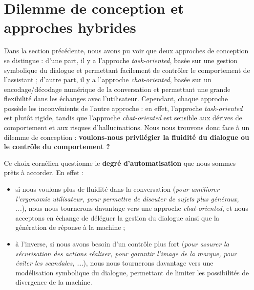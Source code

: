 	
	\newpage
	\section{Dilemme de conception et approches hybrides}
	\label{annex:B.3-ANNEXE-CHATBOTS-DILEMME}
		
		Dans la section précédente, nous avons pu voir que deux approches de conception se distingue :
		d'une part, il y a l'approche \textit{task-oriented}, basée sur une gestion symbolique du dialogue et permettant facilement de contrôler le comportement de l'assistant ;
		d'autre part, il y a l'approche \textit{chat-oriented}, basée sur un encodage/décodage numérique de la conversation et permettant une grande flexibilité dans les échanges avec l'utilisateur.
		Cependant, chaque approche possède les inconvénients de l'autre approche :
		en effet, l'approche \textit{task-oriented} est plutôt rigide, tandis que l'approche \textit{chat-oriented} est sensible aux dérives de comportement et aux risques d'hallucinations.
		Nous nous trouvons donc face à un dilemme de conception : \textbf{voulons-nous privilégier la fluidité du dialogue ou le contrôle du comportement ?}
		
		
		Ce choix cornélien questionne le \textbf{degré d'automatisation} que nous sommes prêts à accorder.
		En effet :
		\begin{itemize}
			\item si nous voulons plus de fluidité dans la conversation (\textit{pour améliorer l'ergonomie utilisateur, pour permettre de discuter de sujets plus généraux, ...}), nous nous tournerons davantage vers une approche \textit{chat-oriented}, et nous acceptons en échange de déléguer la gestion du dialogue ainsi que la génération de réponse à la machine ;
			\item à l'inverse, si nous avons besoin d'un contrôle plus fort (\textit{pour assurer la sécurisation des actions réaliser, pour garantir l'image de la marque, pour éviter les scandales, ...}), nous nous tournerons davantage vers une modélisation symbolique du dialogue, permettant de limiter les possibilités de divergence de la machine.
		\end{itemize}
		
